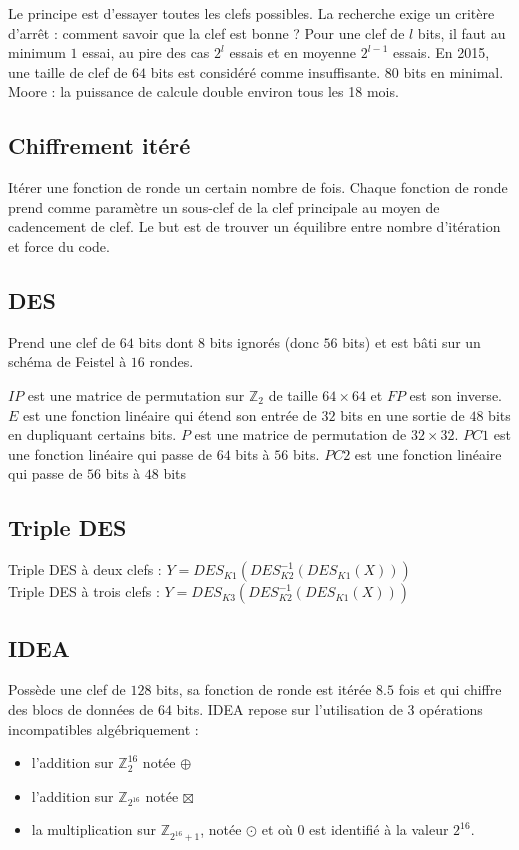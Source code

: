 \documentclass[11pt,a4paper]{report}
\begin{document}
Le principe est d'essayer toutes les clefs possibles. La recherche exige un critère d'arrêt : comment savoir que la clef est bonne ? Pour une clef de $l$ bits, il faut au minimum $1$ essai, au pire des cas $2^l$ essais et en moyenne $2^{l-1}$ essais. En 2015, une taille de clef de $64$ bits est considéré comme insuffisante. $80$ bits en minimal. Moore : la puissance de calcule double environ tous les 18 mois.

\subsection{Chiffrement itéré}

Itérer une fonction de ronde un certain nombre de fois. Chaque fonction de ronde prend comme paramètre un sous-clef de la clef principale au moyen de cadencement de clef. Le but est de trouver un équilibre entre nombre d'itération et force du code.

\subsection{DES}

Prend une clef de $64$ bits dont $8$ bits ignorés (donc $56$ bits) et est bâti sur un schéma de Feistel à $16$ rondes.

$IP$ est une matrice de permutation sur $\mathbb{Z}_2$ de taille $64 \times 64$ et $FP$ est son inverse. $E$ est une fonction linéaire qui étend son entrée de $32$ bits en une sortie de $48$ bits en dupliquant certains bits. $P$ est une matrice de permutation de $32 \times 32$. $PC1$ est une fonction linéaire qui passe de $64$ bits à $56$ bits. $PC2$ est une fonction linéaire qui passe de $56$ bits à $48$ bits

\subsection{Triple DES}

Triple DES à deux clefs  : $Y = DES_{K1}(DES_{K2}^{-1}(DES_{K1}(X)))$ \\
Triple DES à trois clefs : $Y = DES_{K3}(DES_{K2}^{-1}(DES_{K1}(X)))$

\subsection{IDEA}

Possède une clef de $128$ bits, sa fonction de ronde est itérée $8.5$ fois et qui chiffre des blocs de données de $64$ bits. IDEA repose sur l'utilisation de 3 opérations incompatibles algébriquement :
\begin{itemize}
    \item l'addition sur $\mathbb{Z}^{16}_2$ notée $\oplus$
    \item l'addition sur $\mathbb{Z}_{2^{16}}$ notée $\boxtimes$
    \item la multiplication sur $\mathbb{Z}_{2^{16}+1}$, notée $\odot$ et où $0$ est identifié à la valeur $2^{16}$.
\end{itemize}
\end{document}

